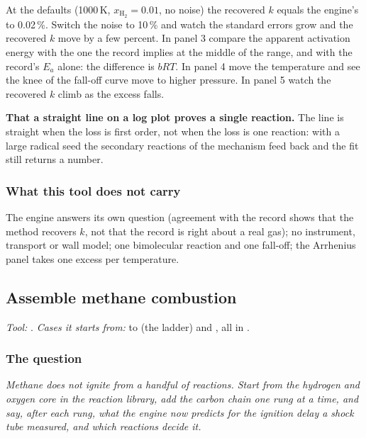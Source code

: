 \documentclass[11pt,a4paper]{article}
\begin{document}
\begin{tryit}
At the defaults (1000\,K, $x_{\mathrm{H}_2}=0.01$, no noise) the recovered
$k$ equals the engine's to 0.02\,\%.  Switch the noise to 10\,\% and watch the
standard errors grow and the recovered $k$ move by a few percent.  In panel 3
compare the apparent activation energy with the one the record implies at the
middle of the range, and with the record's $E_a$ alone: the difference is
$bRT$.  In panel 4 move the temperature and see the knee of the fall-off curve
move to higher pressure.  In panel 5 watch the recovered $k$ climb as the
excess falls.
\end{tryit}

\begin{pitfall}
\textbf{That a straight line on a log plot proves a single reaction.}  The line
is straight when the loss is first order, not when the loss is one reaction:
with a large radical seed the secondary reactions of the mechanism feed back
and the fit still returns a number.
\end{pitfall}

\subsubsection*{What this tool does not carry}

The engine answers its own question (agreement with the record shows that the
method recovers $k$, not that the record is right about a real gas); no
instrument, transport or wall model; one bimolecular reaction and one
fall-off; the Arrhenius panel takes one excess per temperature.

\subsection{Assemble methane combustion}\label{sec:edu-methane-assembly}


\noindent\textit{\small Tool:} .  \textit{\small
Cases it starts from:}  to 
(the ladder) and , all in
.

\subsubsection*{The question}

\emph{Methane does not ignite from a handful of reactions.  Start from the
hydrogen and oxygen core in the reaction library, add the carbon chain one rung
at a time, and say, after each rung, what the engine now predicts for the ignition
delay a shock tube measured, and which reactions decide it.}
\end{document}
